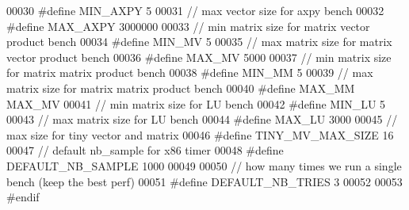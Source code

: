 \begin{DoxyCode}
00030 \textcolor{preprocessor}{#define MIN\_AXPY 5}
00031 \textcolor{comment}{// max vector size for axpy bench}
00032 \textcolor{preprocessor}{#define MAX\_AXPY 3000000}
00033 \textcolor{comment}{// min matrix size for matrix vector product bench}
00034 \textcolor{preprocessor}{#define MIN\_MV 5}
00035 \textcolor{comment}{// max matrix size for matrix vector product bench}
00036 \textcolor{preprocessor}{#define MAX\_MV 5000}
00037 \textcolor{comment}{// min matrix size for matrix matrix product bench}
00038 \textcolor{preprocessor}{#define MIN\_MM 5}
00039 \textcolor{comment}{// max matrix size for matrix matrix product bench}
00040 \textcolor{preprocessor}{#define MAX\_MM MAX\_MV}
00041 \textcolor{comment}{// min matrix size for LU bench}
00042 \textcolor{preprocessor}{#define MIN\_LU 5}
00043 \textcolor{comment}{// max matrix size for LU bench}
00044 \textcolor{preprocessor}{#define MAX\_LU 3000}
00045 \textcolor{comment}{// max size for tiny vector and matrix}
00046 \textcolor{preprocessor}{#define TINY\_MV\_MAX\_SIZE 16}
00047 \textcolor{comment}{// default nb\_sample for x86 timer}
00048 \textcolor{preprocessor}{#define DEFAULT\_NB\_SAMPLE 1000}
00049 
00050 \textcolor{comment}{// how many times we run a single bench (keep the best perf)}
00051 \textcolor{preprocessor}{#define DEFAULT\_NB\_TRIES 3}
00052 
00053 \textcolor{preprocessor}{#endif}
\end{DoxyCode}
